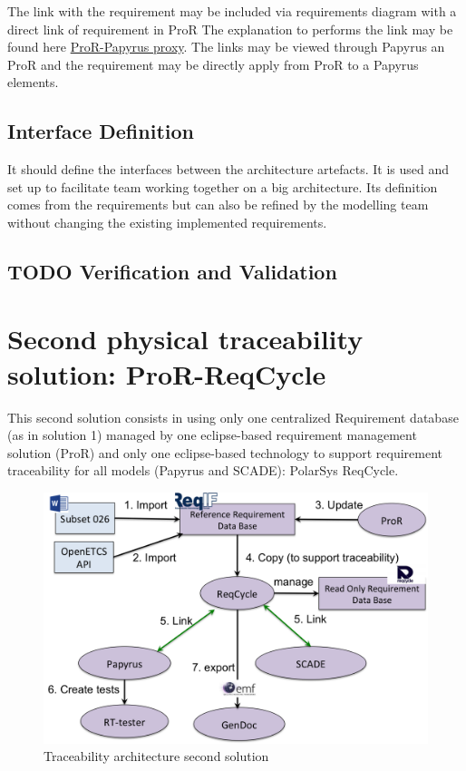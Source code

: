 \documentclass[11pt]{template/openetcs_report}
\begin{document}
The link with the requirement may be included via requirements diagram with a
direct link of requirement in ProR
The explanation to performs the link may be found here \href{https://github.com/openETCS/toolchain/wiki/User-Documentation#tracing-requirements-and-sysml-models}{ProR-Papyrus proxy}.
The links may be viewed through Papyrus an ProR and the requirement may be
directly apply from ProR to a Papyrus elements.


\section{Interface Definition}
\label{sec-9}

It should define the interfaces between the architecture artefacts.  It is used and
set up to facilitate team working together on a big architecture. Its definition
comes from the requirements but can also be refined by the modelling team without
changing the existing implemented requirements.



\section{{\bfseries\sffamily TODO} Verification and Validation}
\label{sec-11}

\chapter{Second physical traceability solution: ProR-ReqCycle}
\label{sec-6}

This second solution consists in using only one centralized Requirement database (as in solution 1) managed by one eclipse-based requirement management solution (ProR) and only one eclipse-based technology to support requirement traceability for all models (Papyrus and SCADE): PolarSys ReqCycle.

\begin{figure}[htb]
\centering
\includegraphics[width=.9\linewidth]{images/second_trace_solution-ProR-ReqCycle.png}
\caption{\label{fig:trace_second}Traceability architecture second solution}
\end{figure}
\end{document}
